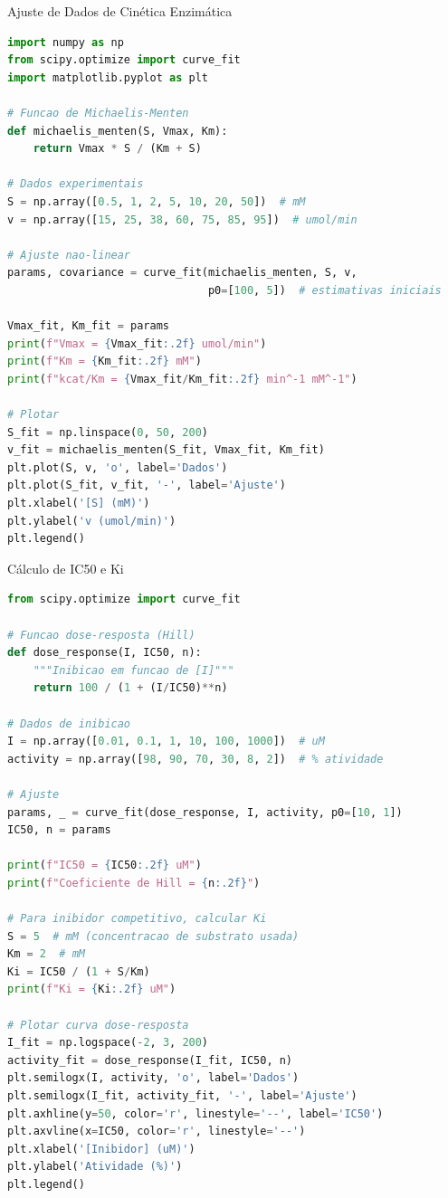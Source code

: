 \begin{frame}[fragile, shrink=10]{Ajuste de Dados de Cinética Enzimática}
\begin{lstlisting}[language=Python, caption=Regressão não-linear para Michaelis-Menten, basicstyle=\ttfamily\tiny]
import numpy as np
from scipy.optimize import curve_fit
import matplotlib.pyplot as plt

# Funcao de Michaelis-Menten
def michaelis_menten(S, Vmax, Km):
    return Vmax * S / (Km + S)

# Dados experimentais
S = np.array([0.5, 1, 2, 5, 10, 20, 50])  # mM
v = np.array([15, 25, 38, 60, 75, 85, 95])  # umol/min

# Ajuste nao-linear
params, covariance = curve_fit(michaelis_menten, S, v,
                               p0=[100, 5])  # estimativas iniciais

Vmax_fit, Km_fit = params
print(f"Vmax = {Vmax_fit:.2f} umol/min")
print(f"Km = {Km_fit:.2f} mM")
print(f"kcat/Km = {Vmax_fit/Km_fit:.2f} min^-1 mM^-1")

# Plotar
S_fit = np.linspace(0, 50, 200)
v_fit = michaelis_menten(S_fit, Vmax_fit, Km_fit)
plt.plot(S, v, 'o', label='Dados')
plt.plot(S_fit, v_fit, '-', label='Ajuste')
plt.xlabel('[S] (mM)')
plt.ylabel('v (umol/min)')
plt.legend()
\end{lstlisting}
\end{frame}

\begin{frame}[fragile, shrink=15]{Cálculo de IC50 e Ki}
\begin{lstlisting}[language=Python, caption=Determinação de IC50, basicstyle=\ttfamily\tiny]
from scipy.optimize import curve_fit

# Funcao dose-resposta (Hill)
def dose_response(I, IC50, n):
    """Inibicao em funcao de [I]"""
    return 100 / (1 + (I/IC50)**n)

# Dados de inibicao
I = np.array([0.01, 0.1, 1, 10, 100, 1000])  # uM
activity = np.array([98, 90, 70, 30, 8, 2])  # % atividade

# Ajuste
params, _ = curve_fit(dose_response, I, activity, p0=[10, 1])
IC50, n = params

print(f"IC50 = {IC50:.2f} uM")
print(f"Coeficiente de Hill = {n:.2f}")

# Para inibidor competitivo, calcular Ki
S = 5  # mM (concentracao de substrato usada)
Km = 2  # mM
Ki = IC50 / (1 + S/Km)
print(f"Ki = {Ki:.2f} uM")

# Plotar curva dose-resposta
I_fit = np.logspace(-2, 3, 200)
activity_fit = dose_response(I_fit, IC50, n)
plt.semilogx(I, activity, 'o', label='Dados')
plt.semilogx(I_fit, activity_fit, '-', label='Ajuste')
plt.axhline(y=50, color='r', linestyle='--', label='IC50')
plt.axvline(x=IC50, color='r', linestyle='--')
plt.xlabel('[Inibidor] (uM)')
plt.ylabel('Atividade (%)')
plt.legend()
\end{lstlisting}
\end{frame}

